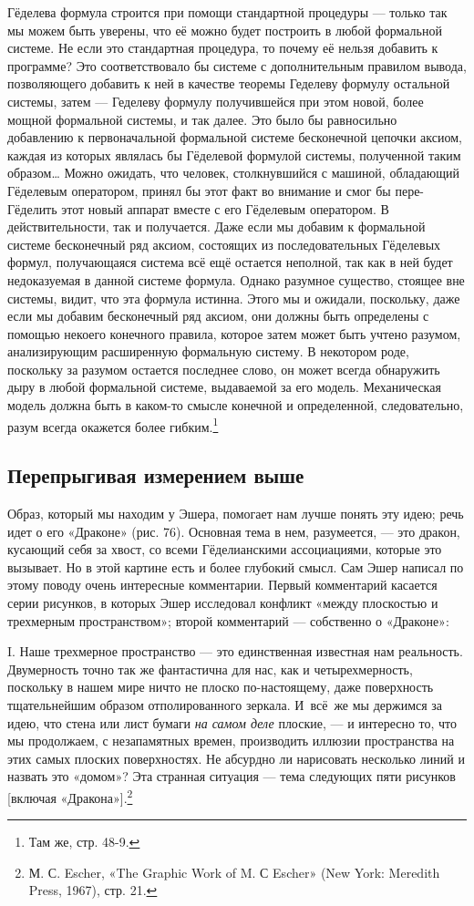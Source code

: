 \documentclass[../main.tex]{subfiles}
\begin{document}
Гёделева формула строится при помощи стандартной процедуры --- только так мы можем быть уверены, что её можно будет построить в любой формальной системе. Не если это стандартная процедура, то почему её нельзя добавить к программе? Это соответствовало бы системе с дополнительным правилом вывода, позволяющего добавить к ней в качестве теоремы Геделеву формулу остальной системы, затем --- Геделеву формулу получившейся при этом новой, более мощной формальной системы, и так далее. Это было бы равносильно добавлению к первоначальной формальной системе бесконечной цепочки аксиом, каждая из которых являлась бы Гёделевой формулой системы, полученной таким образом\ldots{} Можно ожидать, что человек, столкнувшийся с машиной, обладающий Гёделевым оператором, принял бы этот факт во внимание и смог бы пере-Гёделить этот новый аппарат вместе с его Гёделевым оператором. В действительности, так и получается. Даже если мы добавим к формальной системе бесконечный ряд аксиом, состоящих из последовательных Гёделевых формул, получающаяся система всё ещё остается неполной, так как в ней будет недоказуемая в данной системе формула. Однако разумное существо, стоящее вне системы, видит, что эта формула истинна. Этого мы и ожидали, поскольку, даже если мы добавим бесконечный ряд аксиом, они должны быть определены с помощью некоего конечного правила, которое затем может быть учтено разумом, анализирующим расширенную формальную систему. В некотором роде, поскольку за разумом остается последнее слово, он может всегда обнаружить дыру в любой формальной системе, выдаваемой за его модель. Механическая модель должна быть в каком-то смысле конечной и определенной, следовательно, разум всегда окажется более гибким.\footnote{Там же, стр. 48-9.}


\subsection{Перепрыгивая измерением выше}

Образ, который мы находим у Эшера, помогает нам лучше понять эту идею; речь идет о его «Драконе» (рис. 76). Основная тема в нем, разумеется, --- это дракон, кусающий себя за хвост, со всеми Гёделианскими ассоциациями, которые это вызывает. Но в этой картине есть и более глубокий смысл. Сам Эшер написал по этому поводу очень интересные комментарии. Первый комментарий касается серии рисунков, в которых Эшер исследовал конфликт «между плоскостью и трехмерным пространством»; второй комментарий --- собственно о «Драконе»:

I. Наше трехмерное пространство --- это единственная известная нам реальность. Двумерность точно так же фантастична для нас, как и четырехмерность, поскольку в нашем мире ничто не плоско по-настоящему, даже поверхность тщательнейшим образом отполированного зеркала. И~всё~же мы держимся за идею, что стена или лист бумаги \emph{на самом деле} плоские, --- и интересно то, что мы продолжаем, с незапамятных времен, производить иллюзии пространства на этих самых плоских поверхностях. Не абсурдно ли нарисовать несколько линий и назвать это «домом»? Эта странная ситуация --- тема следующих пяти рисунков {[}включая «Дракона»{]}.\footnote{М. С. Escher, «The Graphic Work of M. С Escher» (New York: Meredith Press, 1967), стр. 21.}
\end{document}
